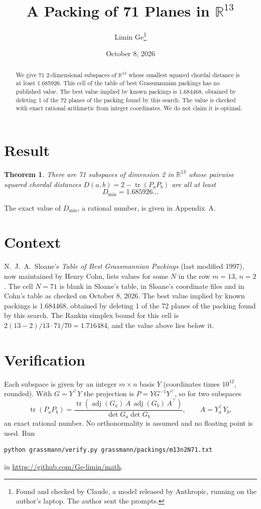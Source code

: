 \documentclass[11pt,a4paper]{article}
\title{A Packing of 71 Planes in $\mathbb{R}^{13}$}
\author{Limin Ge\thanks{Found and checked by Claude, a model released by Anthropic, running on the author's laptop. The author sent the prompts.}}
\date{October 8, 2026}
\newtheorem*{theorem}{Theorem}
\begin{document}
\maketitle
\begin{abstract}
We give 71 2-dimensional subspaces of $\mathbb{R}^{13}$ whose smallest squared chordal distance is at least 1.685926. This cell of the table of best Grassmannian packings has no published value. The best value implied by known packings is 1.684468, obtained by deleting 1 of the 72 planes of the packing found by this search. The value is checked with exact rational arithmetic from integer coordinates. We do not claim it is optimal.
\end{abstract}

\section{Result}
\begin{theorem}
There are 71 subspaces of dimension 2 in $\mathbb{R}^{13}$ whose pairwise squared chordal distances $D(a,b) = 2 - \operatorname{tr}(P_aP_b)$ are all at least
\[ D_{\min} = 1.685926\ldots \]
\end{theorem}
The exact value of $D_{\min}$, a rational number, is given in Appendix~A.


\section{Context}
N.~J.~A.~Sloane's \emph{Table of Best Grassmannian Packings} (last modified 1997), now maintained by Henry Cohn, lists values for some $N$ in the row $m=13$, $n=2$. The cell $N=71$ is blank in Sloane's table, in Sloane's coordinate files and in Cohn's table as checked on October 8, 2026. The best value implied by known packings is 1.684468, obtained by deleting 1 of the 72 planes of the packing found by this search. The Rankin simplex bound for this cell is $2(13-2)/13\cdot 71/70 = 1.716484$, and the value above lies below it.


\section{Verification}
Each subspace is given by an integer $m\times n$ basis $Y$ (coordinates times $10^{12}$, rounded). With $G=Y^\top Y$ the projection is $P=YG^{-1}Y^\top$, so for two subspaces
\[ \operatorname{tr}(P_aP_b)=\frac{\operatorname{tr}(\operatorname{adj}(G_a)\,A\,\operatorname{adj}(G_b)\,A^\top)}{\det G_a\det G_b},\qquad A=Y_a^\top Y_b, \]
an exact rational number. No orthonormality is assumed and no floating point is used. Run
\begin{verbatim}
python grassmann/verify.py grassmann/packings/m13n2N71.txt
\end{verbatim}
in \url{https://github.com/Ge-limin/math}.
\end{document}
